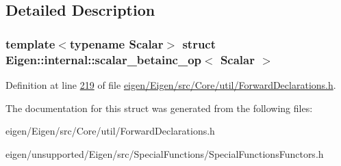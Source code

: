 \subsection{Detailed Description}
\subsubsection*{template$<$typename Scalar$>$\newline
struct Eigen\+::internal\+::scalar\+\_\+betainc\+\_\+op$<$ Scalar $>$}



Definition at line \hyperlink{eigen_2_eigen_2src_2_core_2util_2_forward_declarations_8h_source_l00219}{219} of file \hyperlink{eigen_2_eigen_2src_2_core_2util_2_forward_declarations_8h_source}{eigen/\+Eigen/src/\+Core/util/\+Forward\+Declarations.\+h}.



The documentation for this struct was generated from the following files\+:\begin{DoxyCompactItemize}
\item 
eigen/\+Eigen/src/\+Core/util/\+Forward\+Declarations.\+h\item 
eigen/unsupported/\+Eigen/src/\+Special\+Functions/\+Special\+Functions\+Functors.\+h\end{DoxyCompactItemize}
